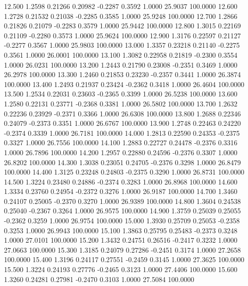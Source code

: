   12.500   1.2598   0.21266   0.20982  -0.2287   0.3592   1.0000  25.9037 100.0000
  12.600   1.2728   0.21532   0.21038  -0.2285   0.3585   1.0000  25.9248 100.0000
  12.700   1.2866   0.21826   0.21079  -0.2283   0.3579   1.0000  25.9442 100.0000
  12.800   1.3015   0.22169   0.21109  -0.2280   0.3573   1.0000  25.9624 100.0000
  12.900   1.3176   0.22597   0.21127  -0.2277   0.3567   1.0000  25.9803 100.0000
  13.000   1.3357   0.23218   0.21140  -0.2275   0.3561   1.0000  26.0001 100.0000
  13.100   1.3082   0.22958   0.21819  -0.2300   0.3554   1.0000  26.0231 100.0000
  13.200   1.2443   0.21790   0.23008  -0.2351   0.3469   1.0000  26.2978 100.0000
  13.300   1.2460   0.21853   0.23230  -0.2357   0.3441   1.0000  26.3874 100.0000
  13.400   1.2493   0.21937   0.23424  -0.2362   0.3418   1.0000  26.4604 100.0000
  13.500   1.2534   0.22031   0.23603  -0.2365   0.3399   1.0000  26.5238 100.0000
  13.600   1.2580   0.22131   0.23771  -0.2368   0.3381   1.0000  26.5802 100.0000
  13.700   1.2632   0.22236   0.23929  -0.2371   0.3366   1.0000  26.6308 100.0000
  13.800   1.2688   0.22346   0.24079  -0.2373   0.3351   1.0000  26.6767 100.0000
  13.900   1.2748   0.22463   0.24220  -0.2374   0.3339   1.0000  26.7181 100.0000
  14.000   1.2813   0.22590   0.24353  -0.2375   0.3327   1.0000  26.7556 100.0000
  14.100   1.2883   0.22727   0.24478  -0.2376   0.3316   1.0000  26.7896 100.0000
  14.200   1.2957   0.22880   0.24596  -0.2376   0.3307   1.0000  26.8202 100.0000
  14.300   1.3038   0.23051   0.24705  -0.2376   0.3298   1.0000  26.8479 100.0000
  14.400   1.3125   0.23248   0.24803  -0.2375   0.3290   1.0000  26.8731 100.0000
  14.500   1.3224   0.23480   0.24886  -0.2374   0.3283   1.0000  26.8968 100.0000
  14.600   1.3334   0.23760   0.24954  -0.2372   0.3276   1.0000  26.9187 100.0000
  14.700   1.3460   0.24107   0.25005  -0.2370   0.3270   1.0000  26.9389 100.0000
  14.800   1.3604   0.24538   0.25040  -0.2367   0.3264   1.0000  26.9575 100.0000
  14.900   1.3759   0.25039   0.25055  -0.2362   0.3259   1.0000  26.9754 100.0000
  15.000   1.3930   0.25709   0.25053  -0.2358   0.3253   1.0000  26.9943 100.0000
  15.100   1.3863   0.25795   0.25483  -0.2373   0.3248   1.0000  27.0101 100.0000
  15.200   1.3432   0.24751   0.26516  -0.2417   0.3232   1.0000  27.0663 100.0000
  15.300   1.3185   0.24079   0.27286  -0.2451   0.3174   1.0000  27.2658 100.0000
  15.400   1.3196   0.24117   0.27551  -0.2459   0.3145   1.0000  27.3625 100.0000
  15.500   1.3224   0.24193   0.27776  -0.2465   0.3123   1.0000  27.4406 100.0000
  15.600   1.3260   0.24281   0.27981  -0.2470   0.3103   1.0000  27.5084 100.0000
